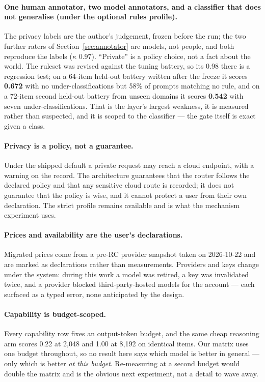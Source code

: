 \documentclass[11pt]{article}
\begin{document}
\paragraph{One human annotator, two model annotators, and a classifier that does not generalise
(under the optional rules profile).}
The privacy labels are the author's judgement, frozen before the run; the two further raters of
Section~\ref{sec:annotator} are models, not people, and both reproduce the labels ($\kappa$ 0.97).
``Private'' is a policy choice, not a fact about the world. The ruleset was revised against the
tuning battery, so its 0.98 there is a regression test; on a 64-item held-out battery written after
the freeze it scores \textbf{0.672} with no under-classifications but 58\% of prompts matching no
rule, and on a 72-item second held-out battery from unseen domains it scores \textbf{0.542} with
seven under-classifications. That is the layer's largest weakness, it is measured rather than
suspected, and it is
scoped to the classifier --- the gate itself is exact given a class.

\paragraph{Privacy is a policy, not a guarantee.} Under the shipped default a private request may
reach a cloud endpoint, with a warning on the record. The architecture guarantees that the router
follows the declared policy and that any sensitive cloud route is recorded; it does not guarantee
that the policy is wise, and it cannot protect a user from their own declaration. The strict
profile remains available and is what the mechanism experiment uses.

\paragraph{Prices and availability are the user's declarations.} Migrated prices come from a
pre-RC provider snapshot taken on 2026-10-22 and are marked as declarations rather than
measurements. Providers and keys change under the system: during this work a model was retired,
a key was invalidated twice, and a provider blocked third-party-hosted models for the account
--- each surfaced as a typed error, none anticipated by the design.

\paragraph{Capability is budget-scoped.} Every capability row fixes an output-token budget, and
the same cheap reasoning arm scores 0.22 at 2{,}048 and 1.00 at 8{,}192 on identical items. Our
matrix uses one budget throughout, so no result here says which model is better in general --- only
which is better \emph{at this budget}. Re-measuring at a second budget would double the matrix and
is the obvious next experiment, not a detail to wave away.
\end{document}
